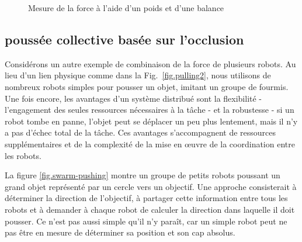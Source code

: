 \begin{figure}
\begin{center}
\caption{Mesure de la force à l'aide d'un poids et d'une balance}\label{fig.scale}
\end{center}
\end{figure}

\subsection{poussée collective basée sur l'occlusion}

Considérons un autre exemple de combinaison de la force de plusieurs robots. Au lieu d'un lien physique comme dans la Fig.~\ref{fig.pulling2}, nous utilisons de nombreux robots simples pour pousser un objet, imitant un groupe de fourmis. Une fois encore, les avantages d'un système distribué sont la flexibilité - l'engagement des seules ressources nécessaires à la tâche - et la robustesse - si un robot tombe en panne, l'objet peut se déplacer un peu plus lentement, mais il n'y a pas d'échec total de la tâche. Ces avantages s'accompagnent de ressources supplémentaires et de la complexité de la mise en œuvre de la coordination entre les robots.

La figure \ref{fig.swarm-pushing} montre un groupe de petits robots poussant un grand objet représenté par un cercle vers un objectif. Une approche consisterait à déterminer la direction de l'objectif, à partager cette information entre tous les robots et à demander à chaque robot de calculer la direction dans laquelle il doit pousser. Ce n'est pas aussi simple qu'il n'y paraît, car un simple robot peut ne pas être en mesure de déterminer sa position et son cap absolus.

